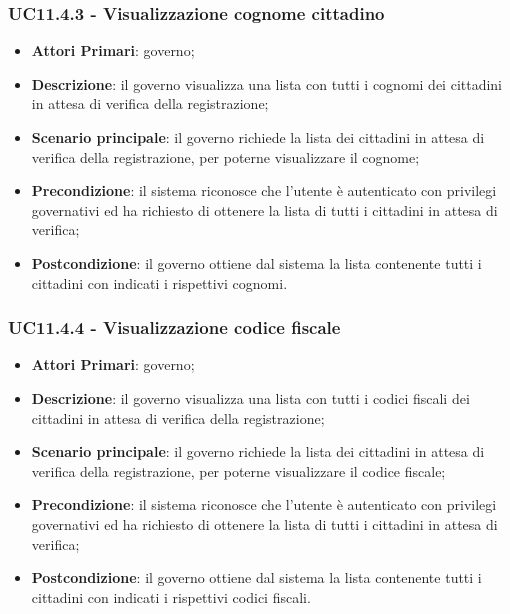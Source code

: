\subsubsection{UC11.4.3 - Visualizzazione cognome cittadino}
	\begin{itemize}
	\item \textbf{Attori Primari}: governo;
	\item \textbf{Descrizione}: il governo visualizza una lista con tutti i cognomi dei cittadini in attesa di verifica della registrazione;
	\item \textbf{Scenario principale}: il governo richiede la lista dei cittadini in attesa di verifica della registrazione, per poterne visualizzare il cognome;
	\item \textbf{Precondizione}: il sistema riconosce che l'utente è autenticato con privilegi governativi ed ha richiesto di ottenere la lista di tutti i cittadini in attesa di verifica;
	\item \textbf{Postcondizione}: il governo ottiene dal sistema la lista contenente tutti i cittadini con indicati i rispettivi cognomi.
\end{itemize}
\subsubsection{UC11.4.4 - Visualizzazione codice fiscale}
\begin{itemize}
	\item \textbf{Attori Primari}: governo;
	\item \textbf{Descrizione}: il governo visualizza una lista con tutti i codici fiscali dei cittadini in attesa di verifica della registrazione;
	\item \textbf{Scenario principale}: il governo richiede la lista dei cittadini in attesa di verifica della registrazione, per poterne visualizzare il codice fiscale;
	\item \textbf{Precondizione}: il sistema riconosce che l'utente è autenticato con privilegi governativi ed ha richiesto di ottenere la lista di tutti i cittadini in attesa di verifica;
	\item \textbf{Postcondizione}: il governo ottiene dal sistema la lista contenente tutti i cittadini con indicati i rispettivi codici fiscali.
\end{itemize}
